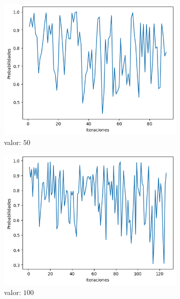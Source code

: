 \documentclass[a4paper,12pt]{article}
\begin{document}
	\begin{figure}[H]
		\centering
		\begin{subfigure}{0.24\textwidth}
			\centering
			\includegraphics[width=\textwidth]{include/parada/50/prob.png}
			\caption{valor: $50$}
		\end{subfigure}
		\hfill
		\begin{subfigure}{0.24\textwidth}
			\centering
			\includegraphics[width=\textwidth]{include/parada/100/prob.png}
			\caption{valor: $100$}
		\end{subfigure}
		\hfill
		\begin{subfigure}{0.24\textwidth}
			\centering

\end{subfigure}
\end{figure}
\end{document}
